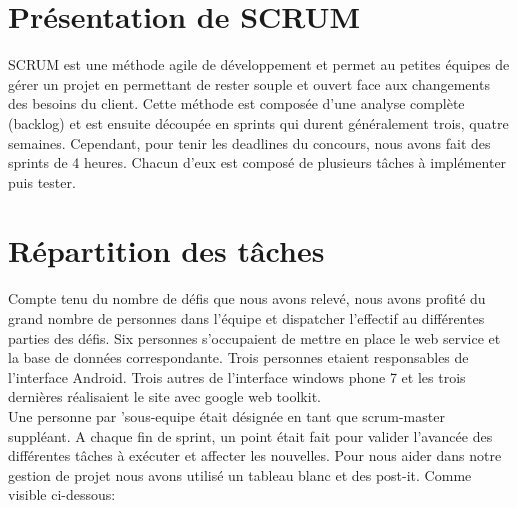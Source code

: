 \documentclass[a4paper,francais,titlepage]{report}
\begin{document}
\section{Présentation de SCRUM}
SCRUM est une méthode agile de développement et permet au petites équipes de gérer un projet en permettant de rester souple et ouvert face aux changements des besoins du client. Cette méthode est composée d'une analyse complète (backlog) et est ensuite découpée en sprints qui durent généralement trois, quatre semaines. Cependant, pour tenir les deadlines du concours, nous avons fait des sprints de 4 heures. Chacun d'eux est composé de plusieurs tâches à implémenter puis tester.
\section{Répartition des tâches}
Compte tenu du nombre de défis que nous avons relevé, nous avons profité du grand nombre de personnes dans l'équipe et dispatcher l'effectif au différentes parties des défis. Six personnes s'occupaient de mettre en place le web service et la base de données correspondante. Trois personnes etaient responsables de l'interface Android. Trois autres de l'interface windows phone 7 et les trois dernières réalisaient le site avec google web toolkit.\\ Une personne par 'sous-equipe était désignée en tant que scrum-master suppléant. A chaque fin de sprint, un point était fait pour valider l'avancée des différentes tâches à exécuter et affecter les nouvelles.
Pour nous aider dans notre gestion de projet nous avons utilisé un tableau blanc et des post-it. Comme visible ci-dessous:\\
\end{document}
